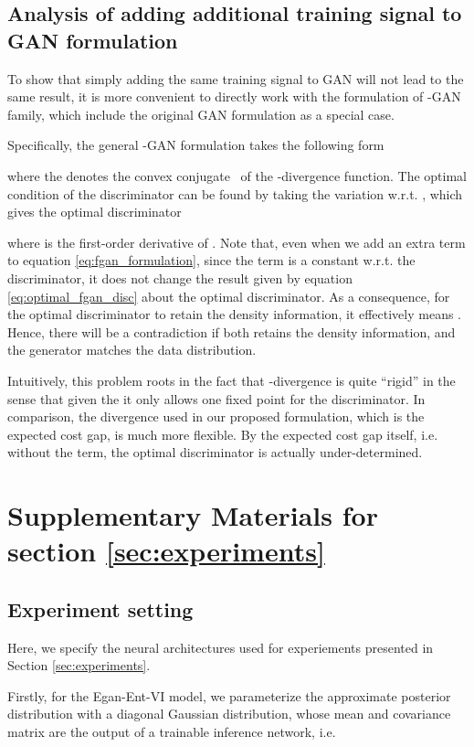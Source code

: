 \documentclass[a4paper]{article}
\begin{document}
\subsection{Analysis of adding additional training signal to GAN formulation}
\label{sec:fgan_reg}
To show that simply adding the same training signal to GAN will not lead to the same result, it is more convenient to directly work with the formulation of -GAN~\citep[equation (6)]{nowozin2016f} family, which include the original GAN formulation as a special case.

Specifically, the general -GAN formulation takes the following form

where the  denotes the convex conjugate~\citep{boyd2004convex} of the -divergence function.
The optimal condition of the discriminator can be found by taking the variation w.r.t. , which gives the optimal discriminator 

where  is the first-order derivative of .
Note that, even when we add an extra term  to equation \eqref{eq:fgan_formulation}, since the term  is a constant w.r.t. the discriminator, it does not change the result given by equation \eqref{eq:optimal_fgan_disc} about the optimal discriminator. 
As a consequence, for the optimal discriminator to retain the density information, it effectively means .
Hence, there will be a contradiction if both  retains the density information, and the generator matches the data distribution.

Intuitively, this problem roots in the fact that -divergence is quite ``rigid'' in the sense that given the  it only allows one fixed point for the discriminator.
In comparison, the divergence used in our proposed formulation, which is the expected cost gap, is much more flexible.
By the expected cost gap itself, i.e. without the  term, the optimal discriminator is actually under-determined.
 \section{Supplementary Materials for section \ref{sec:experiments}}

\subsection{Experiment setting}
\label{sec:experiment_setting}
Here, we specify the neural architectures used for experiements presented in Section \ref{sec:experiments}.

Firstly, for the Egan-Ent-VI model, we parameterize the approximate posterior distribution  with a diagonal Gaussian distribution, whose mean and covariance matrix are the output of a trainable inference network, i.e.
\end{document}
